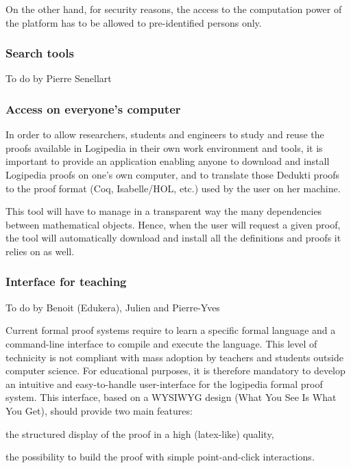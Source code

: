 On the other hand, for security reasons, the access to the computation
power of the platform has to be allowed to pre-identified persons only.

\subsubsection*{Search tools}

{\color{red} To do by Pierre Senellart}

\subsubsection*{Access on everyone's computer}

In order to allow researchers, students and engineers to study and
reuse the proofs available in Logipedia in their own work environment
and tools, it is important to provide an application enabling anyone
to download and install Logipedia proofs on one's own computer, and to
translate those Dedukti proofs to the proof format (Coq, Isabelle/HOL,
etc.) used by the user on her machine.

This tool will have to manage in a transparent way the many
dependencies between mathematical objects. Hence, when the user will
request a given proof, the tool will automatically download and
install all the definitions and proofs it relies on as well.

\subsubsection*{Interface for teaching}

{\color{red} To do by Benoit (Edukera), Julien and Pierre-Yves}

Current formal proof systems require to learn a specific formal
language and a command-line interface to compile and execute the
language. This level of technicity is not compliant with mass
adoption by teachers and students outside computer science. For
educational purposes, it is therefore mandatory to develop an
intuitive and easy-to-handle user-interface for the logipedia formal
proof system. This interface, based on a WYSIWYG design (What You See
Is What You Get), should provide two main features:
\begin{compactitem}
\item the structured display of the proof in a high (latex-like) quality,
\item the possibility to build the proof with simple point-and-click
  interactions.
\end{compactitem}

